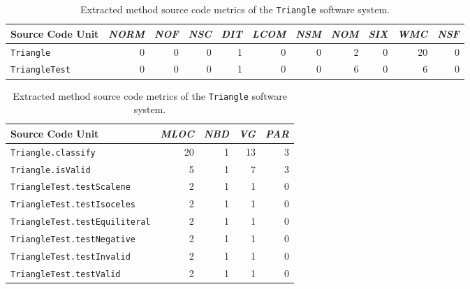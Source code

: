 \begin{table}
  \centering
  \caption{Extracted class source code metrics of the \texttt{Triangle} software system.}
  \label{tab:triangle_class_extracted_metrics}
  \begin{tabular}{|l|r|r|r|r|r|r|r|r|r|r|}
    \hline
    \rowcolor[RGB]{169,196,223}
    \textbf{Source Code Unit} & \textbf{\emph{NORM}} & \textbf{\emph{NOF}} & \textbf{\emph{NSC}} & \textbf{\emph{DIT}} & \textbf{\emph{LCOM}} & \textbf{\emph{NSM}} & \textbf{\emph{NOM}} & \textbf{\emph{SIX}} & \textbf{\emph{WMC}} & \textbf{\emph{NSF}} \\
    \hline \texttt{Triangle} & 0 & 0 & 0 & 1 & 0 & 0 & 2 & 0 & 20 & 0 \\
    \hline \texttt{TriangleTest} & 0 & 0 & 0 & 1 & 0 & 0 & 6 & 0 & 6 & 0 \\
    \hline
  \end{tabular}
  
  \vspace{3em}

  \centering
  \caption{Extracted method source code metrics of the \texttt{Triangle} software system.}
  \label{tab:triangle_method_extracted_metrics}
  \begin{tabular}{|l|r|r|r|r|}
    \hline
    \rowcolor[RGB]{169,196,223}
    \textbf{Source Code Unit} & \textbf{\emph{MLOC}} & \textbf{\emph{NBD}} & \textbf{\emph{VG}} & \textbf{\emph{PAR}} \\
    \hline \texttt{Triangle.classify} & 20 & 1 & 13 & 3 \\
    \hline \texttt{Triangle.isValid} & 5 & 1 & 7 & 3 \\
    \hline \texttt{TriangleTest.testScalene} & 2 & 1 & 1 & 0 \\
    \hline \texttt{TriangleTest.testIsoceles} & 2 & 1 & 1 & 0 \\
    \hline \texttt{TriangleTest.testEquiliteral} & 2 & 1 & 1 & 0 \\
    \hline \texttt{TriangleTest.testNegative} & 2 & 1 & 1 & 0 \\
    \hline \texttt{TriangleTest.testInvalid} & 2 & 1 & 1 & 0 \\
    \hline \texttt{TriangleTest.testValid} & 2 & 1 & 1 & 0 \\
    \hline
  \end{tabular}
\end{table}
\afterpage\clearpage


